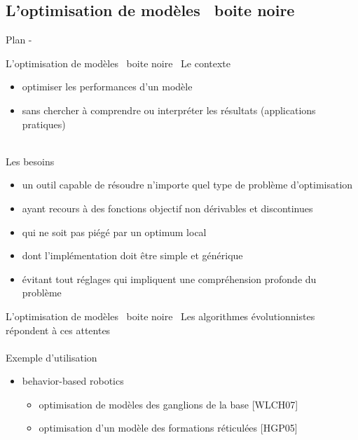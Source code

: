 \documentclass{beamer}
\begin{document}

\subsection{L'optimisation de modèles \og~boite noire~\fg}

\begin{frame}{Plan - \secname}
    \tableofcontents[sectionstyle=hide/hide,subsectionstyle=show/shaded/hide]
\end{frame}

\begin{frame}{L'optimisation de modèles \og~boite noire~\fg}
    Le contexte
    \begin{itemize}
        \item optimiser les performances d'un modèle
        \item sans chercher à comprendre ou interpréter les résultats
              (applications pratiques)
    \end{itemize}
    ~\\
    Les besoins
    \begin{itemize}
        \item un outil capable de résoudre n'importe quel type de problème
              d'optimisation
        \item ayant recours à des fonctions objectif non dérivables et
              discontinues
        \item qui ne soit pas piégé par un optimum local
        \item dont l'implémentation doit être simple et générique
        \item évitant tout réglages qui impliquent une compréhension
              profonde du problème
    \end{itemize}
\end{frame}

\begin{frame}{L'optimisation de modèles \og~boite noire~\fg}
    Les algorithmes évolutionnistes répondent à ces attentes\\
    ~\\
    Exemple d'utilisation
    \begin{itemize}
        \item behavior-based robotics
        \begin{itemize}
            \item optimisation de modèles des ganglions de la base
                  [WLCH07]
            \item optimisation d'un modèle des formations réticulées
                  [HGP05]
        \end{itemize}
    \end{itemize}
\end{frame}
\end{document}
